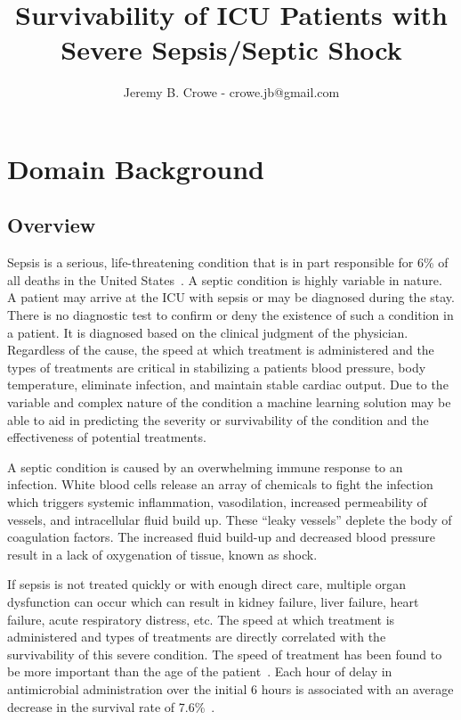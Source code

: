 \documentclass[11pt]{article}
\begin{document}
	
	\title{Survivability of ICU Patients with Severe Sepsis/Septic Shock}
	\author{Jeremy B. Crowe - crowe.jb@gmail.com}
	\maketitle
	
	\section{Domain Background}
	\subsection{Overview}
	Sepsis is a serious, life-threatening condition that is in part responsible for 6\%  of all deaths in the United States~\cite{cdc}. A septic condition is highly variable in nature. A patient may arrive at the ICU with sepsis or may be diagnosed during the stay. There is no diagnostic test to confirm or deny the existence of such a condition in a patient. It is diagnosed based on the clinical judgment of the physician. Regardless of the cause, the speed at which treatment is administered and the types of treatments are critical in stabilizing a patients blood pressure, body temperature, eliminate infection, and maintain stable cardiac output. Due to the variable and complex nature of the condition a machine learning solution may be able to aid in predicting the severity or survivability of the condition and the effectiveness of potential treatments.
	
	A septic condition is caused by an overwhelming immune response to an infection. White blood cells release an array of chemicals to fight the infection which triggers systemic inflammation, vasodilation, increased permeability of vessels, and intracellular fluid build up. These ``leaky vessels'' deplete the body of coagulation factors. The increased fluid build-up and decreased blood pressure result in a lack of oxygenation of tissue, known as shock.
	
	If sepsis is not treated quickly or with enough direct care, multiple organ dysfunction can occur which can result in kidney failure, liver failure, heart failure, acute respiratory distress, etc. The speed at which treatment is administered and types of treatments are directly correlated with the survivability of this severe condition. The speed of treatment has been found to be more important than the age of the patient~\cite{survival2}. Each hour of delay in antimicrobial administration over the initial 6 hours is associated with an average decrease in the survival rate of 7.6\%~\cite{survival}.
	
\end{document}
